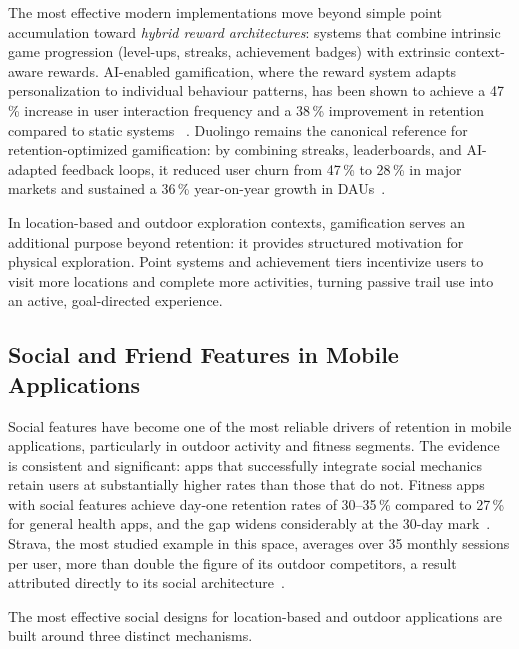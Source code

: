 \documentclass[11pt,a4paper]{article}
\begin{document}
The most effective modern implementations move beyond simple point accumulation toward \textit{hybrid reward architectures}: systems that combine intrinsic game progression (level-ups, streaks, achievement badges) with extrinsic context-aware rewards.
AI-enabled gamification, where the reward system adapts personalization to individual behaviour patterns, has been shown to achieve a 47\,\% increase in user interaction frequency and a 38\,\% improvement in retention compared to static systems ~\cite{amplifai2026gamification}.
Duolingo remains the canonical reference for retention-optimized gamification: by combining streaks, leaderboards, and AI-adapted feedback loops, it reduced user churn from 47\,\% to 28\,\% in major markets and sustained a 36\,\% year-on-year growth in DAUs~\cite{strivecloud2026duolingo}.
 
In location-based and outdoor exploration contexts, gamification serves an additional purpose beyond retention: it provides structured motivation for physical exploration.
Point systems and achievement tiers incentivize users to visit more locations and complete more activities, turning passive trail use into an active, goal-directed experience.


\subsection{Social and Friend Features in Mobile Applications}
\label{sub:sota:social}

Social features have become one of the most reliable drivers of retention in mobile applications, particularly in outdoor activity and fitness segments.
The evidence is consistent and significant: apps that successfully integrate social mechanics retain users at substantially higher rates than those that do not.
Fitness apps with social features achieve day-one retention rates of 30--35\,\% compared to 27\,\% for general health apps, and the gap widens considerably at the 30-day mark~\cite{lucid2025retention}.
Strava, the most studied example in this space, averages over 35 monthly sessions per user, more than double the figure of its outdoor competitors, a result attributed directly to its social architecture~\cite{sensortower2026strava}.
 
The most effective social designs for location-based and outdoor applications are built around three distinct mechanisms.
 
\end{document}
